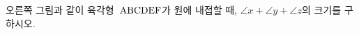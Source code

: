 \noindent\begin{minipage}[t]{0.58\linewidth}\vspace{0pt}\raggedright 오른쪽 그림과 같이 육각형~$\mathrm{ABCDEF}$가 원에 내접할 때, $\angle x+\angle y+\angle z$의 크기를 구하시오.\end{minipage}\hfill\begin{minipage}[t]{0.4\linewidth}\vspace{0pt}\centering \resizebox{\ifdim\width>\linewidth\linewidth\else\width\fi}{!}{}\end{minipage}\par
